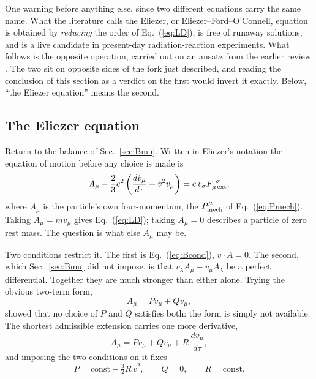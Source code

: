 \documentclass[preprint]{aastex701}
\begin{document}
One warning before anything else, since two different equations carry the same
name. What the literature calls the Eliezer, or Eliezer--Ford--O'Connell,
equation \citep{eliezer1948,ford_oconnell1991} is obtained by \emph{reducing}
the order of Eq.~(\ref{eq:LD}), is free of runaway solutions, and is a live
candidate in present-day radiation-reaction experiments. What follows is the
opposite operation, carried out on an ansatz from the earlier review
\citep{eliezer1947}. The two sit on opposite sides of the fork just described,
and reading the conclusion of this section as a verdict on the first would
invert it exactly. Below, ``the Eliezer equation'' means the second.

\subsection{The Eliezer equation}
\label{sec:eliezereq}

Return to the balance of Sec.~\ref{sec:Bmu}. Written in Eliezer's notation the
equation of motion before any choice is made is
\begin{equation}
\dot A_\mu - \frac{2}{3}e^2\left(\frac{d\dot v_\mu}{d\tau}
  + \dot v^2 v_\mu\right) = e\,v_\sigma F^{\ \sigma}_{\mu\,\rm ext},
\label{eq:eliezerbalance}
\end{equation}
where $A_\mu$ is the particle's own four-momentum, the $P_{\rm mech}^\mu$ of
Eq.~(\ref{eq:Pmech}). Taking $A_\mu = mv_\mu$ gives Eq.~(\ref{eq:LD}); taking
$A_\mu=0$ describes a particle of zero rest mass. The question is what else
$A_\mu$ may be.

Two conditions restrict it. The first is Eq.~(\ref{eq:Bcond}), $v\cdot\dot A=0$.
The second, which Sec.~\ref{sec:Bmu} did not impose, is that
$v_\lambda A_\mu - v_\mu A_\lambda$ be a perfect differential. Together they are
much stronger than either alone. Trying the obvious two-term form,
\begin{equation}
A_\mu = P v_\mu + Q\dot v_\mu ,
\label{eq:PQform}
\end{equation}
\citet{eliezer1946} showed that no choice of $P$ and $Q$ satisfies both: the
form is simply not available. The shortest admissible extension carries one more
derivative,
\begin{equation}
A_\mu = P v_\mu + Q\dot v_\mu + R\,\frac{d\dot v_\mu}{d\tau},
\label{eq:PQRform}
\end{equation}
and imposing the two conditions on it fixes
\begin{equation}
P = \text{const} - \tfrac32 R\,\dot v^2, \qquad Q = 0, \qquad R = \text{const}.
\label{eq:PQRfixed}
\end{equation}
\end{document}
